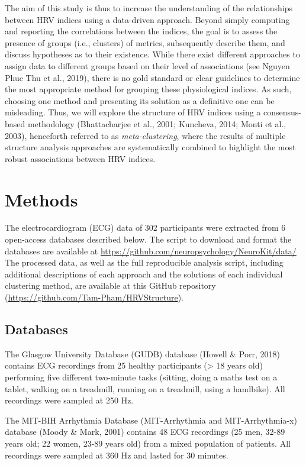 \documentclass[
  english,
  jou,floatsintext]{apa6}
\begin{document}
The aim of this study is thus to increase the understanding of the relationships between HRV indices using a data-driven approach. Beyond simply computing and reporting the correlations between the indices, the goal is to assess the presence of groups (i.e., clusters) of metrics, subsequently describe them, and discuss hypotheses as to their existence. While there exist different approaches to assign data to different groups based on their level of associations (see Nguyen Phuc Thu et al., 2019), there is no gold standard or clear guidelines to determine the most appropriate method for grouping these physiological indices. As such, choosing one method and presenting its solution as a definitive one can be misleading. Thus, we will explore the structure of HRV indices using a consensus-based methodology (Bhattacharjee et al., 2001; Kuncheva, 2014; Monti et al., 2003), henceforth referred to as \emph{meta-clustering}, where the results of multiple structure analysis approaches are systematically combined to highlight the most robust associations between HRV indices.

\hypertarget{methods}{%
\section{Methods}\label{methods}}

The electrocardiogram (ECG) data of 302 participants were extracted from 6 open-access databases described below. The script to download and format the databases are available at \url{https://github.com/neuropsychology/NeuroKit/data/} The processed data, as well as the full reproducible analysis script, including additional descriptions of each approach and the solutions of each individual clustering method, are available at this GitHub repository (\url{https://github.com/Tam-Pham/HRVStructure}).

\hypertarget{databases}{%
\subsection{Databases}\label{databases}}

The Glasgow University Database (GUDB) database (Howell \& Porr, 2018) contains ECG recordings from 25 healthy participants (\textgreater{} 18 years old) performing five different two-minute tasks (sitting, doing a maths test on a tablet, walking on a treadmill, running on a treadmill, using a handbike). All recordings were sampled at 250 Hz.

The MIT-BIH Arrhythmia Database (MIT-Arrhythmia and MIT-Arrhythmia-x) database (Moody \& Mark, 2001) contains 48 ECG recordings (25 men, 32-89 years old; 22 women, 23-89 years old) from a mixed population of patients. All recordings were sampled at 360 Hz and lasted for 30 minutes.
\end{document}
